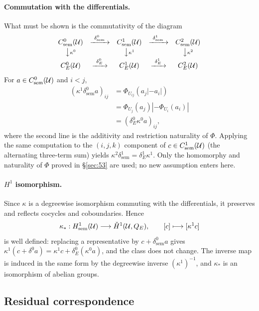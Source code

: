 \paragraph{Commutation with the differentials.}
What must be shown is the commutativity of the diagram
\[
\begin{array}{ccccc}
C^0_{\mathrm{sem}}(\mathcal U)
&\xrightarrow{\ \delta^0_{\mathrm{sem}}\ }&
C^1_{\mathrm{sem}}(\mathcal U)
&\xrightarrow{\ \delta^1_{\mathrm{sem}}\ }&
C^2_{\mathrm{sem}}(\mathcal U)\\[2pt]
\big\downarrow{\scriptstyle\kappa^0}&&\big\downarrow{\scriptstyle\kappa^1}&&\big\downarrow{\scriptstyle\kappa^2}\\[2pt]
C^0_E(\mathcal U)
&\xrightarrow{\ \delta^0_E\ }&
C^1_E(\mathcal U)
&\xrightarrow{\ \delta^1_E\ }&
C^2_E(\mathcal U)
\end{array}
\]
For $a\in C^0_{\mathrm{sem}}(\mathcal{U})$ and $i<j$,
\[
\begin{aligned}
(\kappa^1\delta^0_{\mathrm{sem}}a)_{ij}
&=\Phi_{U_{ij}}(a_j|-a_i|)\\
&=\Phi_{U_j}(a_j)|-\Phi_{U_i}(a_i)|\\
&=(\delta_E^0\kappa^0a)_{ij},
\end{aligned}
\]
where the second line is the additivity and restriction naturality of
$\Phi$. Applying the same computation to the $(i,j,k)$ component of
$c\in C^1_{\mathrm{sem}}(\mathcal{U})$ (the alternating three-term sum) yields
$\kappa^2\delta^1_{\mathrm{sem}}=\delta^1_E\kappa^1$. Only the
homomorphy and naturality of $\Phi$ proved in \S\ref{sec:53} are used;
no new assumption enters here.

\paragraph{$H^1$ isomorphism.}
Since $\kappa$ is a degreewise isomorphism commuting with the
differentials, it preserves and reflects cocycles and coboundaries.
Hence
\[
\kappa_*:
H^1_{\mathrm{sem}}(\mathcal U)
\longrightarrow
\check H^1(\mathcal U,Q_{E}),
\qquad
[c]\longmapsto[\kappa^1c]
\]
is well defined: replacing a representative by
$c+\delta^0_{\mathrm{sem}}a$ gives
$\kappa^1(c+\delta^0a)=\kappa^1c+\delta^0_E(\kappa^0a)$, and the class
does not change. The inverse map is induced in the same form by the
degreewise inverse $(\kappa^1)^{-1}$, and $\kappa_*$ is an isomorphism
of abelian groups.

\subsection{Residual correspondence}\label{sec:55}

